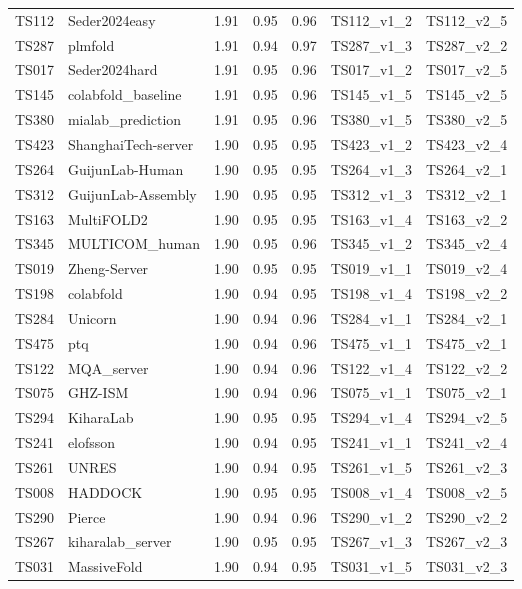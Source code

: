 \begin{longtable}{lllllll}
TS112 & Seder2024easy & 1.91 & 0.95 & 0.96 & TS112\_v1\_2 & TS112\_v2\_5 \\ 
TS287 & plmfold & 1.91 & 0.94 & 0.97 & TS287\_v1\_3 & TS287\_v2\_2 \\ 
TS017 & Seder2024hard & 1.91 & 0.95 & 0.96 & TS017\_v1\_2 & TS017\_v2\_5 \\ 
TS145 & colabfold\_baseline & 1.91 & 0.95 & 0.96 & TS145\_v1\_5 & TS145\_v2\_5 \\ 
TS380 & mialab\_prediction & 1.91 & 0.95 & 0.96 & TS380\_v1\_5 & TS380\_v2\_5 \\ 
TS423 & ShanghaiTech-server & 1.90 & 0.95 & 0.95 & TS423\_v1\_2 & TS423\_v2\_4 \\ 
TS264 & GuijunLab-Human & 1.90 & 0.95 & 0.95 & TS264\_v1\_3 & TS264\_v2\_1 \\ 
TS312 & GuijunLab-Assembly & 1.90 & 0.95 & 0.95 & TS312\_v1\_3 & TS312\_v2\_1 \\ 
TS163 & MultiFOLD2 & 1.90 & 0.95 & 0.95 & TS163\_v1\_4 & TS163\_v2\_2 \\ 
TS345 & MULTICOM\_human & 1.90 & 0.95 & 0.96 & TS345\_v1\_2 & TS345\_v2\_4 \\ 
TS019 & Zheng-Server & 1.90 & 0.95 & 0.95 & TS019\_v1\_1 & TS019\_v2\_4 \\ 
TS198 & colabfold & 1.90 & 0.94 & 0.95 & TS198\_v1\_4 & TS198\_v2\_2 \\ 
TS284 & Unicorn & 1.90 & 0.94 & 0.96 & TS284\_v1\_1 & TS284\_v2\_1 \\ 
TS475 & ptq & 1.90 & 0.94 & 0.96 & TS475\_v1\_1 & TS475\_v2\_1 \\ 
TS122 & MQA\_server & 1.90 & 0.94 & 0.96 & TS122\_v1\_4 & TS122\_v2\_2 \\ 
TS075 & GHZ-ISM & 1.90 & 0.94 & 0.96 & TS075\_v1\_1 & TS075\_v2\_1 \\ 
TS294 & KiharaLab & 1.90 & 0.95 & 0.95 & TS294\_v1\_4 & TS294\_v2\_5 \\ 
TS241 & elofsson & 1.90 & 0.94 & 0.95 & TS241\_v1\_1 & TS241\_v2\_4 \\ 
TS261 & UNRES & 1.90 & 0.94 & 0.95 & TS261\_v1\_5 & TS261\_v2\_3 \\ 
TS008 & HADDOCK & 1.90 & 0.95 & 0.95 & TS008\_v1\_4 & TS008\_v2\_5 \\ 
TS290 & Pierce & 1.90 & 0.94 & 0.96 & TS290\_v1\_2 & TS290\_v2\_2 \\ 
TS267 & kiharalab\_server & 1.90 & 0.95 & 0.95 & TS267\_v1\_3 & TS267\_v2\_3 \\ 
TS031 & MassiveFold & 1.90 & 0.94 & 0.95 & TS031\_v1\_5 & TS031\_v2\_3 \\ 

\end{longtable}
